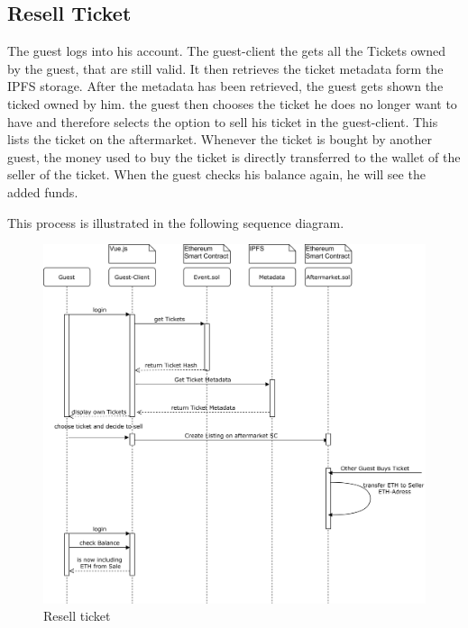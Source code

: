 \subsection{Resell Ticket}
The guest logs into his account. The guest-client the gets all the Tickets owned by the guest, that are still valid. It then retrieves the ticket metadata form the IPFS storage. After the metadata has been retrieved, the guest gets shown the ticked owned by him. the guest then chooses the ticket he does no longer want to have and therefore selects the option to sell his ticket in the guest-client. This lists the ticket on the aftermarket. Whenever the ticket is bought by another guest, the money used to buy the ticket is directly transferred to the wallet of the seller of the ticket. When the guest checks his balance again, he will see the added funds.

This process is illustrated in the following sequence diagram.

\begin{figure}[H]
    \centering
    \includegraphics[width=16cm]{design/diagrams/Resell Ticket.png}
    \caption{Resell ticket}
    \label{fig:Resell-ticket}
\end{figure}

 


